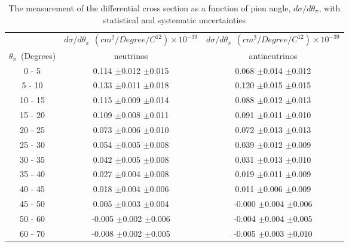 \documentclass[aps,prl,twocolumn,showpacs,superscriptaddress,nofootinbib]{revtex4}
\begin{document}
\begingroup
\squeezetable
\begin{table}[h]
\tabcolsep=0.11cm
\begin{tabular}{c|c|c}
 &  $d\sigma/d\theta_{\pi}\ \  (cm^{2}/Degree/C^{12})\times 10^{-39}$ & $d\sigma/d\theta_{\pi}\ \  (cm^{2}/Degree/C^{12})\times 10^{-39}$\\ 
$\theta_{\pi}$\ (Degrees) &  neutrinos & antineutrinos\\ 
\hline
0 - 5 & 0.114 $\pm$0.012 $\pm$0.015 &0.068 $\pm$0.014 $\pm$0.012\\
5 - 10 & 0.133 $\pm$0.011 $\pm$0.018 &0.120 $\pm$0.015 $\pm$0.015\\
10 - 15 & 0.115 $\pm$0.009 $\pm$0.014 &0.088 $\pm$0.012 $\pm$0.013\\
15 - 20 & 0.109 $\pm$0.008 $\pm$0.011 &0.091 $\pm$0.011 $\pm$0.010\\
20 - 25 & 0.073 $\pm$0.006 $\pm$0.010 &0.072 $\pm$0.013 $\pm$0.013\\
25 - 30 & 0.054 $\pm$0.005 $\pm$0.008 &0.039 $\pm$0.012 $\pm$0.009\\
30 - 35 & 0.042 $\pm$0.005 $\pm$0.008 &0.031 $\pm$0.013 $\pm$0.010\\
35 - 40 & 0.027 $\pm$0.004 $\pm$0.008 &0.019 $\pm$0.011 $\pm$0.009\\
40 - 45 & 0.018 $\pm$0.004 $\pm$0.006 &0.011 $\pm$0.006 $\pm$0.009\\
45 - 50 & 0.005 $\pm$0.003 $\pm$0.004 &-0.000 $\pm$0.004 $\pm$0.006\\
50 - 60 & -0.005 $\pm$0.002 $\pm$0.006 &-0.004 $\pm$0.004 $\pm$0.005\\
60 - 70 & -0.008 $\pm$0.002 $\pm$0.005 &-0.005 $\pm$0.003 $\pm$0.010\\
 
\end{tabular}
\caption{The measurement of the differential cross section as a function of pion angle, $d\sigma/d\theta_\pi$, with statistical and systematic uncertainties}

\end{table}
\endgroup
\end{document}
